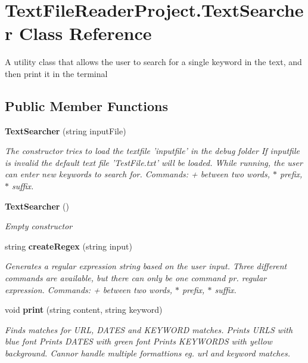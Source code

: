 \section{Text\+File\+Reader\+Project.\+Text\+Searcher Class Reference}
\label{class_text_file_reader_project_1_1_text_searcher}


A utility class that allows the user to search for a single keyword in the text, and then print it in the terminal  


\subsection*{Public Member Functions}
\begin{DoxyCompactItemize}
\item 
{\bf Text\+Searcher} (string input\+File)
\begin{DoxyCompactList}\small\item\em The constructor tries to load the textfile 'inputfile' in the debug folder If inputfile is invalid the default text file 'Test\+File.\+txt' will be loaded. While running, the user can enter new keywords to search for. Commands\+: + between two words, $\ast$ prefix, $\ast$ suffix. \end{DoxyCompactList}\item 
{\bf Text\+Searcher} ()
\begin{DoxyCompactList}\small\item\em Empty constructor \end{DoxyCompactList}\item 
string {\bf create\+Regex} (string input)
\begin{DoxyCompactList}\small\item\em Generates a regular expression string based on the user input. Three different commands are available, but there can only be one command pr. regular expression. Commands\+: + between two words, $\ast$ prefix, $\ast$ suffix. \end{DoxyCompactList}\item 
void {\bf print} (string content, string keyword)
\begin{DoxyCompactList}\small\item\em Finds matches for U\+R\+L, D\+A\+T\+E\+S and K\+E\+Y\+W\+O\+R\+D matches. Prints U\+R\+L\+S with blue font Prints D\+A\+T\+E\+S with green font Prints K\+E\+Y\+W\+O\+R\+D\+S with yellow background. Cannor handle multiple formattions eg. url and keyword matches. \end{DoxyCompactList}\end{DoxyCompactItemize}
